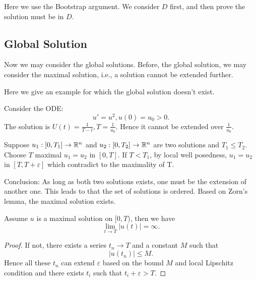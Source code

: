 \begin{remark}
    Here we use the Bootstrap argument. We consider $D$ first, and then prove the solution must be in $D$.
\end{remark}

\subsection{Global Solution}
Now we may consider the global solutions. Before, the global solution, we may consider the maximal solution, i.e., a solution cannot be extended further.

\begin{example}
    Here we give an example for which the global solution doesn't exist.

    \begin{center}
    \end{center}
      Consider the ODE: 
      \[
        u' = u^2, u(0) = u_0 >0.    
      \]
      The solution is $U(t) = \frac{1}{T-t}, T= \frac{1}{u_0}$. Hence it cannot be extended over $\frac{1}{u_0}$.

\end{example}

Suppose $u_1:[0,T_1] \to \mathbb{R}^n$ and $u_2:[0,T_2] \to \mathbb{R}^n$ are two solutions and $T_1\le T_2$. Choose $T$ maximal $u_1=u_2$ in $[0,T]$. If $T<T_1$, by local well posedness, $u_1=u_2$ in $[T,T+\varepsilon]$ which contradict to the maximality of T.

Conclusion: As long as both two solutions exists, one must be the extension of another one. This leads to that the set of solutions is ordered. Based on Zorn's lemma, the maximal solution exists.

\begin{proposition}
    Assume $u$ is a maximal solution on $[0,T)$, then we have 
    \[
        \lim_{t\to T}|u(t)| = \infty.    
    \]
\end{proposition}
\begin{proof}
    If not, there exists a series $t_n \to T$ and a constant $M$ such that 
    \[
        |u(t_n)| \le M.    
    \]
    Hence all these $t_n$ can extend $\varepsilon$ based on the bound $M$ and local Lipschitz condition and there exists $t_i$ such that $t_i+\varepsilon >T$.
\end{proof}

